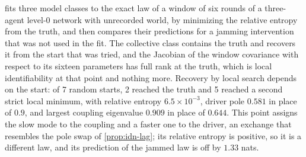 \begin{remark}\label{rem:idn-recovery}
 fits three model classes to the exact law of a window of six rounds of a three-agent level-0 network with unrecorded world, by minimizing the relative entropy from the truth, and then compares their predictions for a jamming intervention that was not used in the fit. The collective class contains the truth and recovers it from the start that was tried, and the Jacobian of the window covariance with respect to its sixteen parameters has full rank at the truth, which is local identifiability at that point and nothing more. Recovery by local search depends on the start: of 7 random starts, 2 reached the truth and 5 reached a second strict local minimum, with relative entropy $6.5\times10^{-3}$, driver pole $0.581$ in place of $0.9$, and largest coupling eigenvalue $0.909$ in place of $0.644$. This point assigns the slow mode to the coupling and a faster one to the driver, an exchange that resembles the pole swap of \cref{prop:idn-lag}; its relative entropy is positive, so it is a different law, and its prediction of the jammed law is off by $1.33$ nats.


\end{remark}
